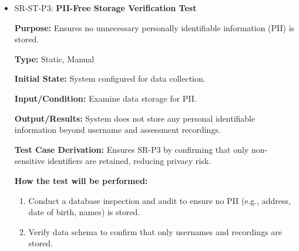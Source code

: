 \documentclass[12pt, titlepage]{article}
\begin{document}
\begin{itemize}
  \item SR-ST-P3: \textbf{PII-Free Storage Verification Test}
  \begin{mdframed}[linewidth=0.5mm]
      \textbf{Purpose:} Ensures no unnecessary personally identifiable information (PII) is stored. \par
      \textbf{Type:} Static, Manual \par
      \textbf{Initial State:} System configured for data collection. \par
      \textbf{Input/Condition:} Examine data storage for PII. \par
      \textbf{Output/Results:} System does not store any personal identifiable information beyond username and assessment recordings. \par
      \textbf{Test Case Derivation:} Ensures SR-P3 by confirming that only non-sensitive identifiers are retained, reducing privacy risk. \par
      \textbf{How the test will be performed:}
      \begin{enumerate}[noitemsep]
        \item Conduct a database inspection and audit to ensure no PII (e.g., address, date of birth, names) is stored.
        \item Verify data schema to confirm that only usernames and recordings are stored.
      \end{enumerate}
  \end{mdframed}


\end{itemize}
\end{document}
